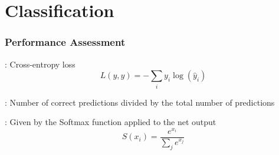 \documentclass[../presentation.tex]{subfiles} %
\begin{document}
\section{Classification}

\begin{frame}
    \frametitle{Performance Assessment}


		\begin{cbox}
			: Cross-entropy loss 
			\begin{equation*}
				L(y, \hat{y}) = -\sum_{i} y_i \log(\hat{y}_i)
			\end{equation*}
		\end{cbox}

		\begin{cbox}
			: Number of correct predictions divided by the total number of predictions
		\end{cbox}

		\begin{cbox}
			: Given by the Softmax function applied to the net output
			\begin{equation*}
				S(x_i) = \frac{e^{x_i}}{\sum_{j} e^{x_j}}
			\end{equation*}
		\end{cbox}

\end{frame}
\end{document}
